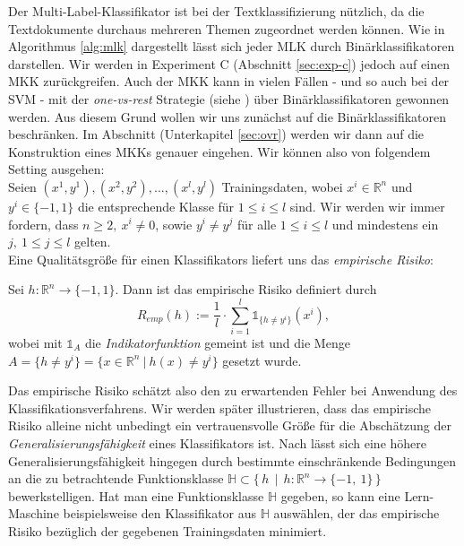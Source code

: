 Der Multi-Label-Klassifikator ist bei der Textklassifizierung nützlich, da die Textdokumente durchaus mehreren Themen zugeordnet werden können. Wie in Algorithmus \ref{alg:mlk} dargestellt lässt sich jeder MLK durch Binärklassifikatoren darstellen. Wir werden in Experiment C (Abschnitt \ref{sec:exp-c}) jedoch auf einen MKK zurückgreifen. Auch der MKK kann in vielen Fällen - und so auch bei der SVM - mit der \emph{one-vs-rest} Strategie (siehe \cite{hsu-comp-02}) über Binärklassifikatoren gewonnen werden. Aus diesem Grund wollen wir uns zunächst auf die Binärklassifikatoren beschränken. Im Abschnitt  (Unterkapitel \ref{sec:ovr}) werden wir dann auf die Konstruktion eines MKKs genauer eingehen. Wir können also von folgendem Setting ausgehen: \\

Seien $(x^1,y^1),(x^2,y^2),...,(x^l,y^l)$ Trainingsdaten, wobei $x^i \in \mathbb{R}^n$  und $y^i \in \{-1,1\}$ die entsprechende Klasse für $1 \leq i \leq l$ sind. Wir werden wir immer fordern, dass $n\geq 2,\ x^i \neq 0$, sowie $y^i \neq y^j$ für alle  $1 \leq i \leq l$ und mindestens ein $j,\  1 \leq j \leq l$ gelten. \\


Eine Qualitätsgröße für einen Klassifikators liefert uns das \emph{empirische Risiko}:
\begin{definition}
	Sei $h: \mathbb{R}^n \rightarrow \{-1,1\}$. Dann ist das empirische Risiko definiert durch
	\begin{equation}
	R_{emp}(h) := \frac{1}{l} \cdot \sum_{i=1}^{l}{\mathds{1}_{\{ h \neq y^i \}}(x^i)},
	\end{equation}
	wobei mit $\mathds{1}_{A}$ die \emph{Indikatorfunktion} gemeint ist und die Menge $A=\{ h \neq y^i \}=\{ x \in \mathbb{R}^n \ | \ h(x) \neq y^i \}$ gesetzt wurde. 
\end{definition}

Das empirische Risiko schätzt also den zu erwartenden Fehler bei Anwendung des Klassifikationsverfahrens. Wir werden später illustrieren, dass das empirische Risiko alleine nicht unbedingt ein vertrauensvolle Größe für die Abschätzung der \emph{Generalisierungsfähigkeit} eines Klassifikators ist. Nach \cite{sb-umlfta} lässt sich eine höhere Generalisierungsfähigkeit hingegen durch bestimmte einschränkende Bedingungen an die zu betrachtende Funktionsklasse $\mathbb{H} \subset \{ \, h \, \mid  \, h: \mathbb{R}^n \rightarrow \{-1 ,\ 1\} \, \}$ bewerkstelligen. Hat man eine Funktionsklasse $\mathbb{H}$ gegeben, so kann eine Lern-Maschine beispielsweise den Klassifikator aus $\mathbb{H}$ auswählen, der das empirische Risiko bezüglich der gegebenen Trainingsdaten minimiert.

